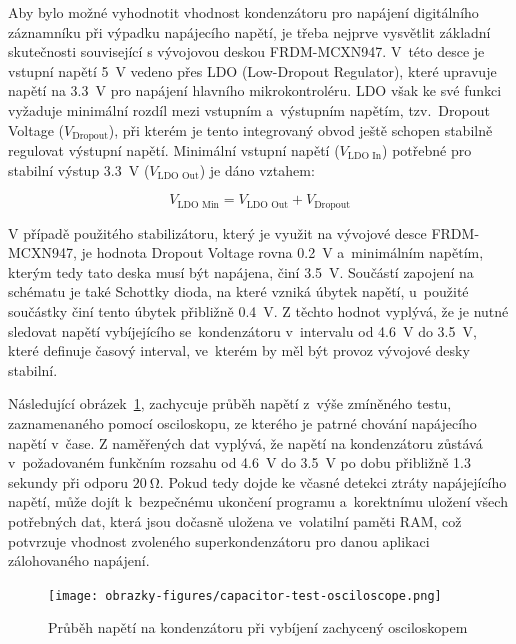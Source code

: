 \newpage

Aby bylo možné vyhodnotit vhodnost kondenzátoru pro napájení digitálního záznamníku při výpadku napájecího napětí, je třeba nejprve vysvětlit základní skutečnosti související s vývojovou deskou FRDM-MCXN947. V~této desce je vstupní napětí \SI{5}{\volt} vedeno přes LDO (Low-Dropout Regulator), které upravuje napětí na \SI{3.3}{\volt} pro napájení hlavního mikrokontroléru. LDO však ke své funkci vyžaduje minimální rozdíl mezi vstupním a~výstupním napětím, tzv.~Dropout Voltage ($V_{\text{Dropout}}$), při kterém je tento integrovaný obvod ještě schopen stabilně regulovat výstupní napětí. Minimální vstupní napětí ($V_{\text{LDO In}}$) potřebné pro stabilní výstup \SI{3.3}{\volt} ($V_{\text{LDO Out}}$) je dáno vztahem:

\[
V_{\text{LDO Min}} = V_{\text{LDO Out}} + V_{\text{Dropout}}
\]

V případě použitého stabilizátoru, který je využit na vývojové desce FRDM-MCXN947, je hodnota Dropout Voltage rovna \SI{0.2}{\volt} a~minimálním napětím, kterým tedy tato deska musí být napájena, činí \SI{3.5}{\volt}. Součástí zapojení na schématu je také Schottky dioda, na které vzniká úbytek napětí, u~použité součástky činí tento úbytek přibližně \SI{0.4}{\volt}. Z těchto hodnot vyplývá, že je nutné sledovat napětí vybíjejícího se~kondenzátoru v~intervalu od \SI{4.6}{\volt} do \SI{3.5}{\volt}, které definuje časový interval, ve~kterém by měl být provoz vývojové desky stabilní.

Následující obrázek~\ref{fig:test-capacitors-osciloscope}, zachycuje průběh napětí z~výše zmíněného testu, zaznamenaného pomocí osciloskopu, ze kterého je patrné chování napájecího napětí v~čase. Z naměřených dat vyplývá, že napětí na kondenzátoru zůstává v~požadovaném funkčním rozsahu od \SI{4.6}{\volt} do \SI{3.5}{\volt} po dobu přibližně 1.3 sekundy při odporu $\SI{20}{\ohm}$. Pokud tedy dojde ke včasné detekci ztráty napájejícího napětí, může dojít k~bezpečnému ukončení programu a~korektnímu uložení všech potřebných dat, která jsou dočasně uložena ve~volatilní paměti RAM, což potvrzuje vhodnost zvoleného superkondenzátoru pro danou aplikaci zálohovaného napájení.

\begin{figure}[h]
    \centering
    \texttt{[image: obrazky-figures/capacitor-test-osciloscope.png]}
    
    \caption{Průběh napětí na kondenzátoru při vybíjení zachycený osciloskopem}
    \label{fig:test-capacitors-osciloscope}
\end{figure}


